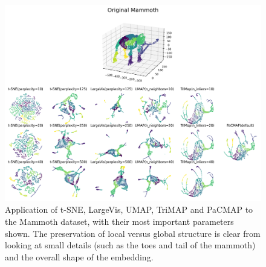 \begin{figure}[ht]
	\begin{center}
		\includegraphics[width=0.95\columnwidth]{figures/Mammoth_21_3}
		\caption{Application of t-SNE, LargeVis, UMAP, TriMAP and PaCMAP to the Mammoth dataset, with their most important parameters shown. The preservation of local versus global structure is clear from looking at small details (such as the toes and tail of the mammoth) and the overall shape of the embedding.}
		\label{fig:Mammoth}
	\end{center}
\end{figure}